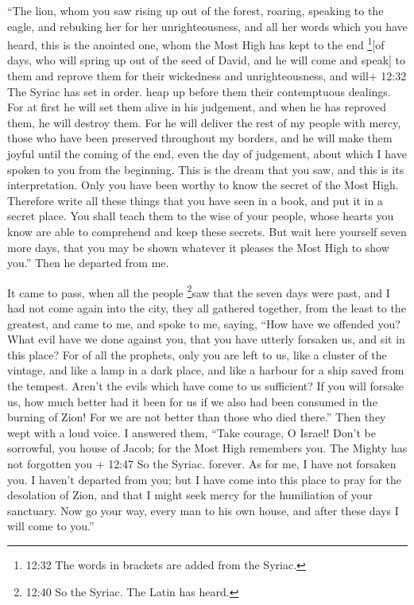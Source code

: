  ``The lion, whom you saw rising up out of the forest,
roaring, speaking to the eagle, and rebuking her for her
unrighteousness, and all her words which you have heard, 
this is the anointed one, whom the Most High has kept to the end
\footnote{12:32 The words in brackets are added from the Syriac.}{[}of
days, who will spring up out of the seed of David, and he will come and
speak{]} to them and reprove them for their wickedness and
unrighteousness, and will+ 12:32 The Syriac has set in order. heap up
before them their contemptuous dealings.  For at first he
will set them alive in his judgement, and when he has reproved them, he
will destroy them.  For he will deliver the rest of my
people with mercy, those who have been preserved throughout my borders,
and he will make them joyful until the coming of the end, even the day
of judgement, about which I have spoken to you from the beginning.
 This is the dream that you saw, and this is its
interpretation.  Only you have been worthy to know the
secret of the Most High.  Therefore write all these things
that you have seen in a book, and put it in a secret place.
 You shall teach them to the wise of your people, whose
hearts you know are able to comprehend and keep these secrets.
 But wait here yourself seven more days, that you may be
shown whatever it pleases the Most High to show you.'' Then he departed
from me.

 It came to pass, when all the people \footnote{12:40 So
  the Syriac. The Latin has heard.}saw that the seven days were past,
and I had not come again into the city, they all gathered together, from
the least to the greatest, and came to me, and spoke to me, saying,
 ``How have we offended you? What evil have we done against
you, that you have utterly forsaken us, and sit in this place?
 For of all the prophets, only you are left to us, like a
cluster of the vintage, and like a lamp in a dark place, and like a
harbour for a ship saved from the tempest.  Aren't the
evils which have come to us sufficient?  If you will
forsake us, how much better had it been for us if we also had been
consumed in the burning of Zion!  For we are not better
than those who died there.'' Then they wept with a loud voice. I
answered them,  ``Take courage, O Israel! Don't be
sorrowful, you house of Jacob;  for the Most High remembers
you. The Mighty has not forgotten you + 12:47 So the Syriac. forever.
 As for me, I have not forsaken you. I haven't departed
from you; but I have come into this place to pray for the desolation of
Zion, and that I might seek mercy for the humiliation of your sanctuary.
 Now go your way, every man to his own house, and after
these days I will come to you.''

